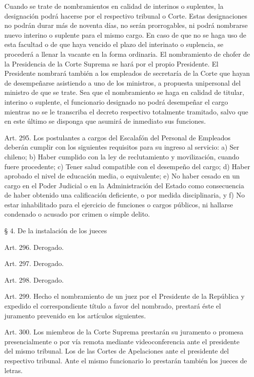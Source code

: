     Cuando se trate de nombramientos en calidad de interinos o suplentes, la designación podrá hacerse por el respectivo tribunal o Corte.
    Estas designaciones no podrán durar más de noventa días, no serán prorrogables, ni podrá nombrarse nuevo interino o suplente para el mismo cargo. En caso de que no se haga uso de esta facultad o de que haya vencido el plazo del interinato o suplencia, se procederá a llenar la vacante en la forma ordinaria.
    El nombramiento de chofer de la Presidencia de la Corte Suprema se hará por el propio Presidente.
    El Presidente nombrará también a los empleados de secretaría de la Corte que hayan de desempeñarse asistiendo a uno de los ministros, a propuesta unipersonal del ministro de que se trate.
    Sea que el nombramiento se haga en calidad de titular, interino o suplente, el funcionario designado no podrá desempeñar el cargo mientras no se le transcriba el decreto respectivo totalmente tramitado, salvo que en este último se disponga que asumirá de inmediato sus funciones.

    Art. 295. Los postulantes a cargos del Escalafón del Personal de Empleados deberán cumplir con los siguientes requisitos para su ingreso al servicio:
    a) Ser chileno;
    b) Haber cumplido con la ley de reclutamiento y movilización, cuando fuere procedente;
    c) Tener salud compatible con el desempeño del cargo;
    d) Haber aprobado el nivel de educación media, o equivalente;
    e) No haber cesado en un cargo en el Poder Judicial o en la Administración del Estado como consecuencia de haber obtenido una calificación deficiente, o por medida disciplinaria, y
    f) No estar inhabilitado para el ejercicio de funciones o cargos públicos, ni hallarse condenado o acusado por crimen o simple delito.



    § 4. De la instalación de los jueces

    Art. 296. Derogado.


    Art. 297. Derogado.



    Art. 298. Derogado.



    Art. 299. Hecho el nombramiento de un juez por el Presidente de la República y expedido el correspondiente título a favor del nombrado, prestará éste el juramento prevenido en los artículos siguientes.

    Art. 300. Los miembros de la Corte Suprema prestarán su juramento o promesa presencialmente o por vía remota mediante videoconferencia ante el presidente del mismo tribunal.
    Los de las Cortes de Apelaciones ante el presidente del respectivo tribunal.
    Ante el mismo funcionario lo prestarán también los jueces de letras.



